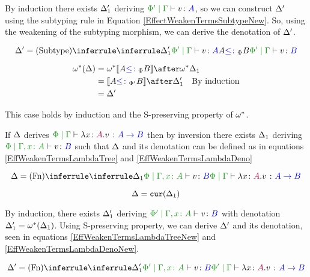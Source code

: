 By induction there exists $\Delta_1'$ deriving $\etyperelation{\P'}{\G}{v}{A}$, so we can construct $\Delta'$ using the subtyping rule in Equation \ref{EffectWeakenTermsSubtypeNew}.
So, using the weakening of the subtyping morphism, we can derive the denotation of $\Delta'$.

\begin{equation}
    \label{EffectWeakenTermsSubtypeNew}
    \D' = \ntreeruleII{\vsubtype}{\treeruleI{\D_1'}{\etyperelation{\P'}{\G}{v}{A}}}{A \subtypep B}{\etyperelation{\P'}{\G}{v}{B}}
\end{equation}

\begin{align*}
    \w\star(\D) & = \w\star{\deno{A\subtypep B}}\after\w\star\D_1 \\
    & = \deno{A\subtypepp B}\after\D_1'\qt{By induction}\\
    & = \D'
\end{align*}

\case{\vfun}
This case holds by induction and the S-preserving property of $\omega^*$.

If $\Delta$ derives $\gpetyperelation{\lam{x}{A}{v}}{\ab}$ then by inversion there exists $\Delta_1$ deriving $\etyperelation{\P}{\gax}{v}{B}$ such that $\Delta$ and its denotation can be defined as in equations \ref{EffWeakenTermsLambdaTree} and \ref{EffWeakenTermsLambdaDeno}


\begin{equation}
    \label{EffWeakenTermsLambdaTree}
    \D = \ntreeruleI{\vfun}{
        \treeruleI{\D_1}{\etyperelation{\P}{\gax}{v}{B}}
    }{\gpetyperelation{\lam{x}{A}{v}}{\ab}}
\end{equation}


\begin{equation}\label{EffWeakenTermsLambdaDeno}
    \Delta = \texttt{cur}(\Delta_1)
\end{equation}

By induction, there exists $\Delta_1'$ deriving $\etyperelation{\P'}{\gax}{v}{B}$ with denotation $\Delta_1' = \omega^*(\Delta_1)$. Using S-preserving property, we can derive $\Delta'$ and its denotation, seen in equations \ref{EffWeakenTermsLambdaTreeNew} and \ref{EffWeakenTermsLambdaDenoNew}.

\begin{equation}
    \label{EffWeakenTermsLambdaTreeNew}
    \D' = \ntreeruleI{\vfun}{
        \treeruleI{\D_1'}{\etyperelation{\P'}{\gax}{v}{B}}
    }{\etyperelation{\P'}{\G}{\lam{x}{A}{v}}{\ab}}
\end{equation}


